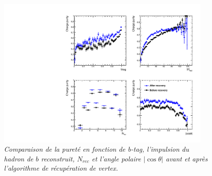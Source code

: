 

\begin{figure}
	{\centering
		\includegraphics[width=0.95\textwidth]{ILD/plots/recovery-purity-comparison.pdf}
		\caption{\sl Comparaison de la pureté en fonction de b-tag, l'impulsion du hadron de $b$ reconstruit, $N_ {rec}$ et l'angle polaire $|\cos\theta|$ avant et après l'algorithme de récupération de vertex. 
		}
		\label{fig:RecoveryPurityComparison_3F}
	}
\end{figure}

